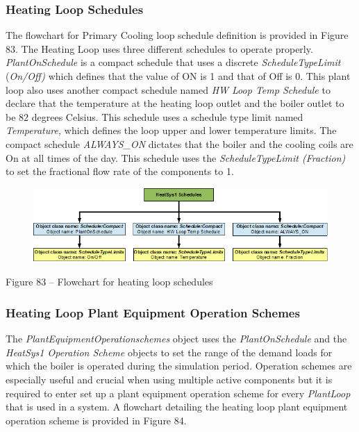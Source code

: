\subsubsection{Heating Loop Schedules}\label{heating-loop-schedules}

The flowchart for Primary Cooling loop schedule definition is provided in Figure 83. The Heating Loop uses three different schedules to operate properly. \emph{PlantOnSchedule} is a compact schedule that uses a discrete \emph{ScheduleTypeLimit} (\emph{On/Off)} which defines that the value of ON is 1 and that of Off is 0. This plant loop also uses another compact schedule named \emph{HW Loop Temp Schedule} to declare that the temperature at the heating loop outlet and the boiler outlet to be 82 degrees Celsius. This schedule uses a schedule type limit named \emph{Temperature,} which defines the loop upper and lower temperature limits. The compact schedule \emph{ALWAYS\_ON} dictates that the boiler and the cooling coils are On at all times of the day. This schedule uses the \emph{ScheduleTypeLimit (Fraction)} to set the fractional flow rate of the components to 1.

\begin{figure}[htbp]
\centering
\includegraphics{media/image083.png}
\caption{}
\end{figure}

Figure 83 -- Flowchart for heating loop schedules

\subsubsection{Heating Loop Plant Equipment Operation Schemes}\label{heating-loop-plant-equipment-operation-schemes}

The \emph{PlantEquipmentOperationschemes} object uses the \emph{PlantOnSchedule} and the \emph{HeatSys1 Operation Scheme} objects to set the range of the demand loads for which the boiler is operated during the simulation period. Operation schemes are especially useful and crucial when using multiple active components but it is required to enter set up a plant equipment operation scheme for every \emph{PlantLoop} that is used in a system. A flowchart detailing the heating loop plant equipment operation scheme is provided in Figure 84.

